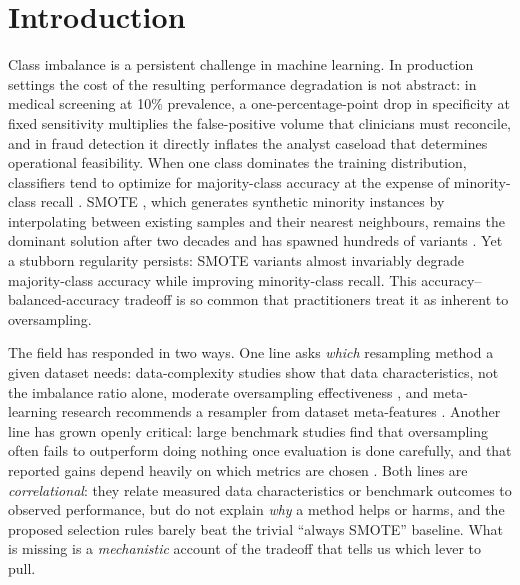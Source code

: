 \section{Introduction}\label{sec:intro}

Class imbalance is a persistent challenge in machine learning. In production
settings the cost of the resulting performance degradation is not abstract: in
medical screening at 10\% prevalence, a one-percentage-point drop in specificity
at fixed sensitivity multiplies the false-positive volume that clinicians must
reconcile, and in fraud detection it directly inflates the analyst caseload that
determines operational feasibility. When one class dominates the training
distribution, classifiers tend to optimize for majority-class accuracy at the
expense of minority-class recall \cite{he2009learning}. SMOTE
\cite{chawla2002smote}, which generates synthetic minority instances by
interpolating between existing samples and their nearest neighbours, remains the
dominant solution after two decades and has spawned hundreds of variants
\cite{fernandez2018smote,kovacs2019smote}. Yet a stubborn regularity persists:
SMOTE variants almost invariably degrade majority-class accuracy while improving
minority-class recall. This accuracy--balanced-accuracy tradeoff is so common
that practitioners treat it as inherent to oversampling.

The field has responded in two ways. One line asks \emph{which} resampling
method a given dataset needs: data-complexity studies show that data
characteristics, not the imbalance ratio alone, moderate oversampling
effectiveness \cite{komorniczak2022data}, and meta-learning research recommends
a resampler from dataset meta-features
\cite{carvalho2025resampling,jiang2026beyond}. Another line has grown openly
critical: large benchmark studies find that oversampling often fails to
outperform doing nothing once evaluation is done carefully, and that reported
gains depend heavily on which metrics are chosen
\cite{tarawneh2022stop,elor2022smote}. Both lines are
\emph{correlational}: they relate measured data characteristics or benchmark
outcomes to observed performance, but do not explain \emph{why} a method helps
or harms, and the proposed selection rules barely beat the trivial ``always
SMOTE'' baseline. What is missing is a \emph{mechanistic} account of the
tradeoff that tells us which lever to pull.

